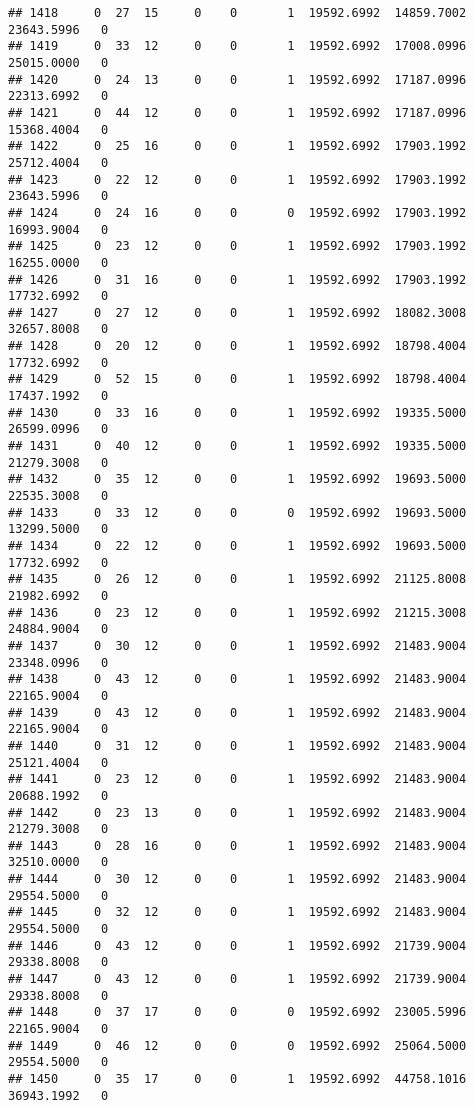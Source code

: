\documentclass[
]{article}
\begin{document}
\begin{enumerate}
\begin{verbatim}
## 1418     0  27  15     0    0       1  19592.6992  14859.7002  23643.5996   0
## 1419     0  33  12     0    0       1  19592.6992  17008.0996  25015.0000   0
## 1420     0  24  13     0    0       1  19592.6992  17187.0996  22313.6992   0
## 1421     0  44  12     0    0       1  19592.6992  17187.0996  15368.4004   0
## 1422     0  25  16     0    0       1  19592.6992  17903.1992  25712.4004   0
## 1423     0  22  12     0    0       1  19592.6992  17903.1992  23643.5996   0
## 1424     0  24  16     0    0       0  19592.6992  17903.1992  16993.9004   0
## 1425     0  23  12     0    0       1  19592.6992  17903.1992  16255.0000   0
## 1426     0  31  16     0    0       1  19592.6992  17903.1992  17732.6992   0
## 1427     0  27  12     0    0       1  19592.6992  18082.3008  32657.8008   0
## 1428     0  20  12     0    0       1  19592.6992  18798.4004  17732.6992   0
## 1429     0  52  15     0    0       1  19592.6992  18798.4004  17437.1992   0
## 1430     0  33  16     0    0       1  19592.6992  19335.5000  26599.0996   0
## 1431     0  40  12     0    0       1  19592.6992  19335.5000  21279.3008   0
## 1432     0  35  12     0    0       1  19592.6992  19693.5000  22535.3008   0
## 1433     0  33  12     0    0       0  19592.6992  19693.5000  13299.5000   0
## 1434     0  22  12     0    0       1  19592.6992  19693.5000  17732.6992   0
## 1435     0  26  12     0    0       1  19592.6992  21125.8008  21982.6992   0
## 1436     0  23  12     0    0       1  19592.6992  21215.3008  24884.9004   0
## 1437     0  30  12     0    0       1  19592.6992  21483.9004  23348.0996   0
## 1438     0  43  12     0    0       1  19592.6992  21483.9004  22165.9004   0
## 1439     0  43  12     0    0       1  19592.6992  21483.9004  22165.9004   0
## 1440     0  31  12     0    0       1  19592.6992  21483.9004  25121.4004   0
## 1441     0  23  12     0    0       1  19592.6992  21483.9004  20688.1992   0
## 1442     0  23  13     0    0       1  19592.6992  21483.9004  21279.3008   0
## 1443     0  28  16     0    0       1  19592.6992  21483.9004  32510.0000   0
## 1444     0  30  12     0    0       1  19592.6992  21483.9004  29554.5000   0
## 1445     0  32  12     0    0       1  19592.6992  21483.9004  29554.5000   0
## 1446     0  43  12     0    0       1  19592.6992  21739.9004  29338.8008   0
## 1447     0  43  12     0    0       1  19592.6992  21739.9004  29338.8008   0
## 1448     0  37  17     0    0       0  19592.6992  23005.5996  22165.9004   0
## 1449     0  46  12     0    0       0  19592.6992  25064.5000  29554.5000   0
## 1450     0  35  17     0    0       1  19592.6992  44758.1016  36943.1992   0

\end{verbatim}
\end{enumerate}
\end{document}
